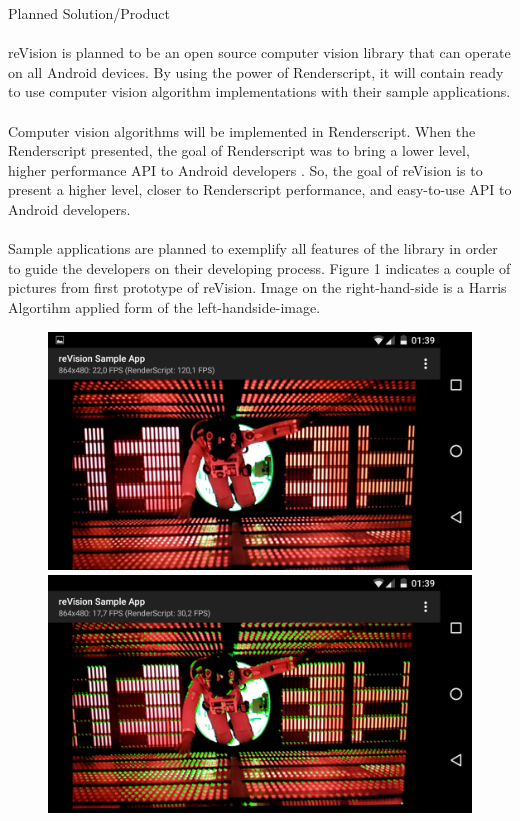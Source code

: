 \documentclass[12pt, a4paper]{article} \pagenumbering{gobble}
\begin{document}
\begin{section}{Planned Solution/Product}
  \paragraph{}{
  reVision is planned to be an open source computer vision library that can operate on all Android devices.
  By using the power of Renderscript, it will contain ready to use computer vision algorithm implementations
  with their sample applications.
  }
  \paragraph{}{
  Computer vision algorithms will be implemented in Renderscript. When the Renderscript presented, the goal of
  Renderscript was to bring a lower level, higher performance API to Android developers \cite{renderscript_release}.
  So, the goal of reVision is to present a higher level, closer to Renderscript performance, and easy-to-use
  API to Android developers.
  }
  \paragraph{}{
  Sample applications are planned to exemplify all features of the library in order to guide the developers on
  their developing process. Figure 1 indicates a couple of pictures from first prototype of reVision. Image on the
  right-hand-side is a Harris Algortihm applied form of the left-handside-image.

  }
  \begin{figure}[h]
    \centering
    \includegraphics[scale=0.17]{clean.png}
    \includegraphics[scale=0.17]{detected.png}


\end{figure}
\end{section}
\end{document}
